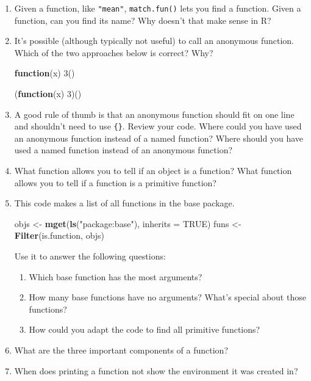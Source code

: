 \documentclass[]{book}
\newenvironment{Shaded}{\begin{snugshade}}{\end{snugshade}}
\newcommand{\ControlFlowTok}[1]{\textcolor[rgb]{0.13,0.29,0.53}{\textbf{#1}}}
\newcommand{\DataTypeTok}[1]{\textcolor[rgb]{0.13,0.29,0.53}{#1}}
\newcommand{\DecValTok}[1]{\textcolor[rgb]{0.00,0.00,0.81}{#1}}
\newcommand{\KeywordTok}[1]{\textcolor[rgb]{0.13,0.29,0.53}{\textbf{#1}}}
\newcommand{\NormalTok}[1]{#1}
\newcommand{\OtherTok}[1]{\textcolor[rgb]{0.56,0.35,0.01}{#1}}
\newcommand{\StringTok}[1]{\textcolor[rgb]{0.31,0.60,0.02}{#1}}
\theoremstyle{definition}
\theoremstyle{definition}
\theoremstyle{definition}
\theoremstyle{remark}
\begin{document}
\begin{enumerate}
\def\labelenumi{\arabic{enumi}.}
\item
  Given a function, like \texttt{"mean"}, \texttt{match.fun()} lets you
  find a function. Given a function, can you find its name? Why doesn't
  that make sense in R?
\item
  It's possible (although typically not useful) to call an anonymous
  function. Which of the two approaches below is correct? Why?

\begin{Shaded}
\begin{Highlighting}[]
\ControlFlowTok{function}\NormalTok{(x) }\DecValTok{3}\NormalTok{()}
\end{Highlighting}
\end{Shaded}

\begin{Shaded}
\begin{Highlighting}[]
\NormalTok{(}\ControlFlowTok{function}\NormalTok{(x) }\DecValTok{3}\NormalTok{)()}
\end{Highlighting}
\end{Shaded}
\item
  A good rule of thumb is that an anonymous function should fit on one
  line and shouldn't need to use \texttt{\{\}}. Review your code. Where
  could you have used an anonymous function instead of a named function?
  Where should you have used a named function instead of an anonymous
  function?
\item
  What function allows you to tell if an object is a function? What
  function allows you to tell if a function is a primitive function?
\item
  This code makes a list of all functions in the base package.

\begin{Shaded}
\begin{Highlighting}[]
\NormalTok{objs <-}\StringTok{ }\KeywordTok{mget}\NormalTok{(}\KeywordTok{ls}\NormalTok{(}\StringTok{"package:base"}\NormalTok{), }\DataTypeTok{inherits =} \OtherTok{TRUE}\NormalTok{)}
\NormalTok{funs <-}\StringTok{ }\KeywordTok{Filter}\NormalTok{(is.function, objs)}
\end{Highlighting}
\end{Shaded}

  Use it to answer the following questions:

  \begin{enumerate}
  \def\labelenumii{\alph{enumii}.}
  \item
    Which base function has the most arguments?
  \item
    How many base functions have no arguments? What's special about
    those functions?
  \item
    How could you adapt the code to find all primitive functions?
  \end{enumerate}
\item
  What are the three important components of a function?
\item
  When does printing a function not show the environment it was created
  in?
\end{enumerate}
\end{document}
